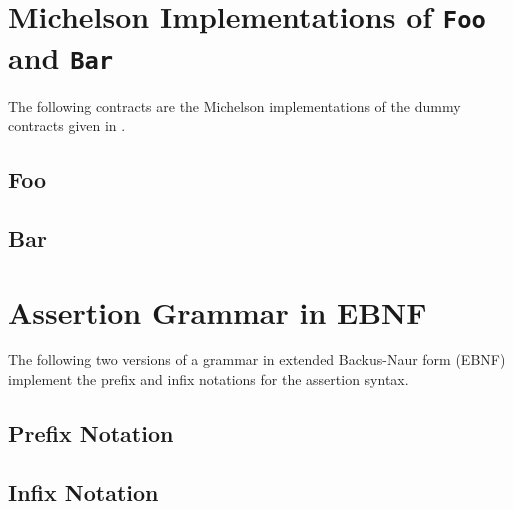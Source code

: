 \appendix
\chapter{Michelson Implementations of \texttt{Foo} and \texttt{Bar}}\label{apx:cost_analysis_contract}
The following contracts are the Michelson implementations of the dummy contracts given in .
\section{Foo}

				 
\section{Bar}


\chapter{Assertion Grammar in EBNF}\label{apx:grammar}
The following two versions of a grammar in extended Backus-Naur form (EBNF) implement the prefix and infix notations for the assertion syntax. 

\section{Prefix Notation}


\section{Infix Notation}


